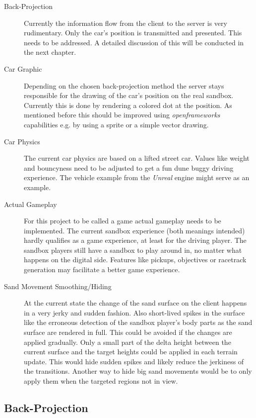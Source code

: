\documentclass[12pt,a4paper,twoside,titlepage,headsepline,numbers=noenddot,listof=totoc,index=totoc,bibliography=totoc]{scrartcl}
\theoremstyle{break}
\begin{document}
\begin{description}
	\item[Back-Projection] Currently the information flow from the client to the server is very rudimentary. Only the car's position is transmitted and presented. This needs to be addressed. A detailed discussion of this will be conducted in the next chapter. 
	
	\item[Car Graphic] Depending on the chosen back-projection method the server stays responsible for the drawing of the car's position on the real sandbox. Currently this is done by rendering a colored dot  at the position. As mentioned before this should be improved using \textit{openframeworks} capabilities e.g. by using a sprite or a simple vector drawing.
	
	\item[Car Physics] The current car physics are based on a lifted street car. Values like weight and bouncyness need to be adjusted to get a fun dune buggy driving experience. The vehicle example from the \textit{Unreal} engine might serve as an example.
	
	\item[Actual Gameplay] For this project to be called a game actual gameplay needs to be implemented. The current sandbox experience (both meanings intended) hardly qualifies as a game experience, at least for the driving player. The sandbox players still have a sandbox to play around in, no matter what happens on the digital side. Features like pickups, objectives or racetrack generation may facilitate a better game experience.
	
	\item[Sand Movement Smoothing/Hiding] At the current state the change of the sand surface on the client happens in a very jerky and sudden fashion. Also short-lived spikes in the surface like the erroneous detection of the sandbox player's body parts as the sand surface are rendered in full. This could be avoided if the changes are applied gradually. Only a small part of the delta height between the current surface and the target heights could be applied in each terrain update. This would hide sudden spikes and likely reduce the jerkiness of the transitions. Another way to hide big sand movements would be to only apply them when the targeted regions not in view. 
\end{description}

\subsection{Back-Projection}
\label{ch:backProjection}
\end{document}
